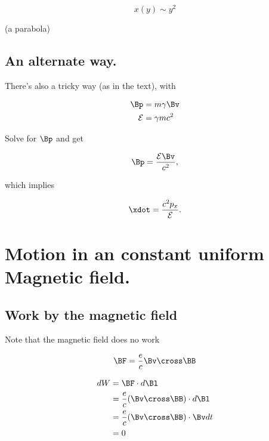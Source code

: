\begin{equation}\label{eqn:relativisticElectrodynamicsT3:480}
x(y) \sim y^2
\end{equation}

(a parabola)

\subsection{An alternate way.}

There's also a tricky way (as in the text), with 

\begin{align}\label{eqn:relativisticElectrodynamicsT3:160}
\Bp &= m \gamma \Bv  \\
\mathcal{E} &= \gamma m c^2 
\end{align}

Solve for $\Bp$ and get

\begin{equation}\label{eqn:relativisticElectrodynamicsT3:180}
\Bp = \frac{\mathcal{E} \Bv}{c^2},
\end{equation}

which implies

\begin{equation}\label{eqn:relativisticElectrodynamicsT3:200}
\xdot = \frac{c^2 p_x}{\mathcal{E}}.
\end{equation}

\section{Motion in an constant uniform Magnetic field.}

\subsection{Work by the magnetic field}

Note that the magnetic field does no work

\begin{equation}\label{eqn:relativisticElectrodynamicsT3:500}
\BF = \frac{e}{c} \Bv \cross \BB
\end{equation}

\begin{align*}
dW &= 
\BF \cdot d\Bl \\
&=
\frac{e}{c} (\Bv \cross \BB) \cdot d\Bl \\
&=
\frac{e}{c} (\Bv \cross \BB) \cdot \Bv dt \\
&= 0
\end{align*}

